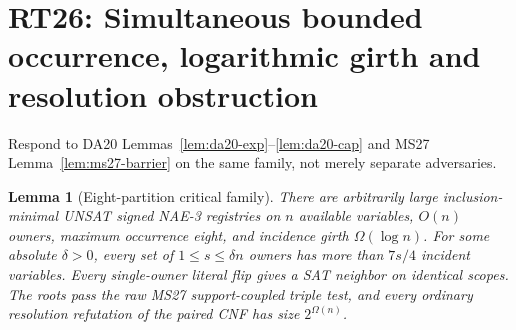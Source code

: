 \documentclass[11pt]{article}
\newtheorem{lemma}[theorem]{Lemma}
\begin{document}
\section{RT26: Simultaneous bounded occurrence, logarithmic girth and resolution obstruction}\label{sec:rt26}
Respond to DA20 Lemmas~\ref{lem:da20-exp}--\ref{lem:da20-cap} and MS27 Lemma~\ref{lem:ms27-barrier} on the same family, not merely separate adversaries.
\begin{lemma}[Eight-partition critical family]\label{lem:rt26-eight}
There are arbitrarily large inclusion-minimal UNSAT signed NAE-3 registries on $n$ available variables, $O(n)$ owners, maximum occurrence eight, and incidence girth $\Omega(\log n)$. For some absolute $\delta>0$, every set of $1\le s\le\delta n$ owners has more than $7s/4$ incident variables. Every single-owner literal flip gives a SAT neighbor on identical scopes. The roots pass the raw MS27 support-coupled triple test, and every ordinary resolution refutation of the paired CNF has size $2^{\Omega(n)}$.
\end{lemma}
\end{document}
